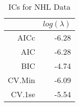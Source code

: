 \begin{table}[ht]
\centering
\begin{tabular}{rr}
  \hline
 & $log(\lambda)$ \\ 
  \hline
AICc & -6.28 \\ 
  AIC & -6.28 \\ 
  BIC & -4.74 \\ 
  CV.Min & -6.09 \\ 
  CV.1se & -5.54 \\ 
   \hline
\end{tabular}
\caption{ICs for NHL Data} 
\label{tab:ic}
\end{table}
